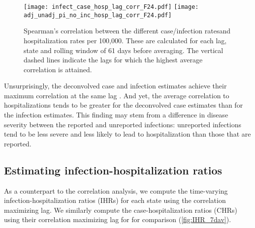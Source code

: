 \begin{figure}[!tb]
\centering
\texttt{[image: infect\_case\_hosp\_lag\_corr\_F24.pdf]} 
\texttt{[image: adj\_unadj\_pi\_no\_inc\_hosp\_lag\_corr\_F24.pdf]} 
\caption{Spearman's correlation between the different case/infection ratesand
hospitalization rates per 100,000. These are calculated for each
lag, state and rolling window of 61 days before averaging. 
The vertical dashed lines indicate the lags
for which the highest average correlation is attained. }
\label{fig:correlations}
\end{figure}
    


Unsurprisingly, the deconvolved case and infection estimates achieve their
maximum correlation at the same lag . And yet, the average correlation to
hospitalizations tends to be greater for the deconvolved case estimates than for
the infection estimates. This finding may
stem from a difference in disease severity between the reported and unreported
infections: unreported infections tend to be less severe and less likely to
lead to hospitalization than those that are reported.




\subsection{Estimating infection-hospitalization ratios}
\label{sec:ihrs}

As a counterpart to the correlation analysis, we compute the time-varying
infection-hospitalization ratios (IHRs) for each state using the correlation
maximizing lag. We similarly compute the
case-hospitalization ratios (CHRs) using their correlation maximizing lag for
for comparison (\autoref{fig:IHR_7dav}). 

